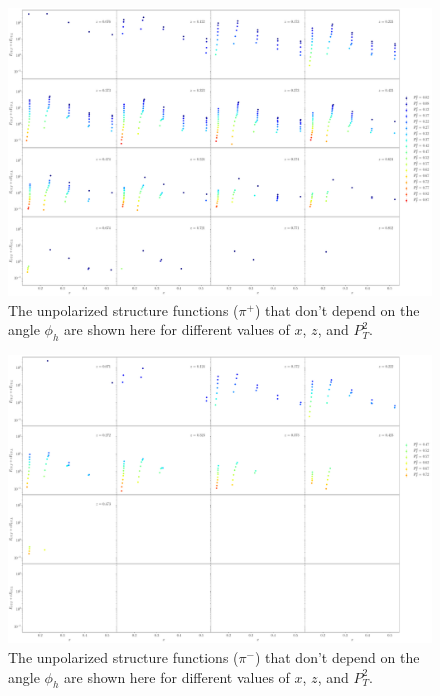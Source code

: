 \begin{figure}
	\centering 
	\includegraphics[width = \textwidth]{image/plots/sidis/pip_f0_superimpose_pt2.pdf}
	\caption{The unpolarized structure functions ($\pi^+$) that don't depend on the angle $\phi_h$ are shown here for different values of $x$, $z$, and $P_T^2$.}
	\label{fig:pipf0x}	
\end{figure}

\begin{figure}
	\centering 
	\includegraphics[width = \textwidth]{image/plots/sidis/pim_f0_superimpose_pt2.pdf}
	\caption{The unpolarized structure functions ($\pi^-$) that don't depend on the angle $\phi_h$ are shown here for different values of $x$, $z$, and $P_T^2$.}
	\label{fig:pipf0x}	
\end{figure}

